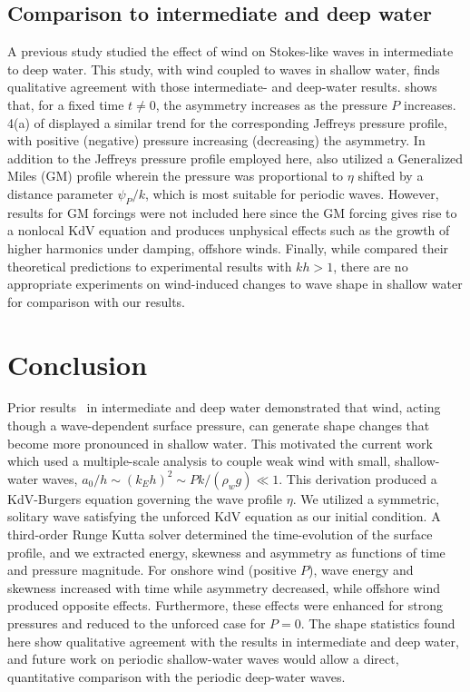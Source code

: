 \documentclass{jfm}
\begin{document}
\subsection{Comparison to intermediate and deep water}
A previous study \citep{zdyrski2020wind} studied the effect of
wind on Stokes-like waves in intermediate to deep water.
This study, with wind coupled to waves in shallow water, finds
qualitative agreement with those intermediate- and deep-water results.
 shows that, for a fixed time $t \neq 0$,
the asymmetry increases as the pressure $P$ increases.
\Figname{} 4(a) of \citet{zdyrski2020wind} displayed a similar trend for
the corresponding Jeffreys pressure profile, with positive (negative)
pressure increasing (decreasing) the asymmetry.
In addition to the Jeffreys pressure profile employed here,
\citet{zdyrski2020wind} also utilized a Generalized Miles (GM) profile
wherein the pressure was proportional to $\eta$ shifted by a distance
parameter $\psi_P/k$, which is most suitable for periodic waves.
However, results for GM forcings were not included here since the GM
forcing gives rise to a nonlocal KdV equation and produces unphysical
effects such as the growth of higher harmonics under damping, offshore
winds.
Finally, while \citet{zdyrski2020wind} compared their theoretical
predictions to experimental results with $kh > 1$, there are no
appropriate experiments on wind-induced changes to wave shape in shallow
water for comparison with our results.

\section{Conclusion}
Prior results~\citep{zdyrski2020wind} in intermediate and deep water
demonstrated that wind, acting though a wave-dependent surface
pressure, can generate shape changes that become more pronounced in
shallow water.
This motivated the current work which used a multiple-scale analysis to
couple weak wind with small, shallow-water waves, \ie{} $a_0/h \sim (k_E
h)^2 \sim P k/(\rho_w g) \ll 1$.
This derivation produced a KdV-Burgers equation governing the wave
profile $\eta$.
We utilized a symmetric, solitary wave satisfying the unforced KdV
equation as our initial condition.
A third-order Runge Kutta solver determined the time-evolution of the
surface profile, and we extracted energy, skewness and asymmetry as
functions of time and pressure magnitude.
For onshore wind (positive $P$), wave energy and skewness increased with
time while asymmetry decreased, while offshore wind produced opposite
effects.
Furthermore, these effects were enhanced for strong pressures and
reduced to the unforced case for $P=0$.
The shape statistics found here show qualitative agreement with the
results in intermediate and deep water, and future work on periodic
shallow-water waves would allow a direct, quantitative comparison with
the periodic deep-water waves.
\end{document}
